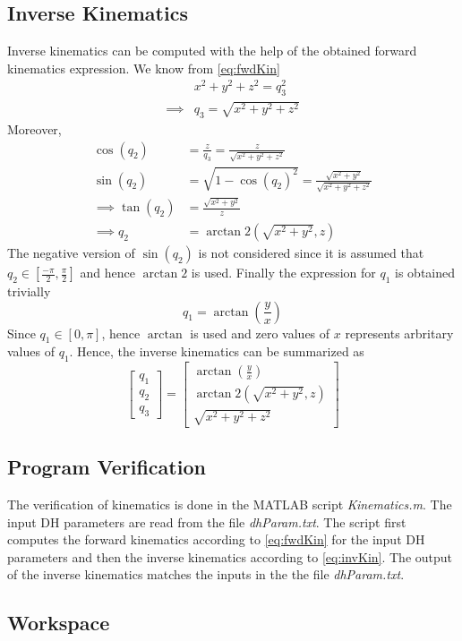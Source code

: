 \subsection{Inverse Kinematics}
Inverse kinematics can be computed with the help of the obtained forward kinematics expression. We know from \eqref{eq:fwdKin}
\begin{align*}
	&x^2 + y^2 + z^2 = q_3^2 \\
	\implies&q_3 = \sqrt{x^2 + y^2 + z^2}
\end{align*}
Moreover,
\begin{align*}
	\cos\left(q_2\right) &= \frac{z}{q_3} = \frac{z}{\sqrt{x^2 + y^2 + z^2}}\\
	\sin\left(q_2\right) &= \sqrt{1 - \cos\left(q_2\right)^2} = \frac{\sqrt{x^2 + y^2}}{\sqrt{x^2 + y^2 + z^2}} \\
	\implies \tan\left(q_2\right) &= \frac{\sqrt{x^2 + y^2}}{z} \\
	\implies q_2 &= \arctan2\left(\sqrt{x^2 + y^2},z\right)
\end{align*}
The negative version of $\sin\left(q_2\right)$ is not considered since it is assumed that $q_2 \in \left[\frac{-\pi}{2},\frac{\pi}{2}\right]$ and hence $\arctan2$ is used. Finally the expression for $q_1$ is obtained trivially
\begin{equation*}
	q_1 = \arctan\left(\frac{y}{x}\right)
\end{equation*}
Since $q_1 \in \left[0,\pi\right]$, hence $\arctan$ is used and zero values of $x$ represents arbritary values of $q_1$.
Hence, the inverse kinematics can be summarized as 
\begin{equation}
	\begin{bmatrix}
		q_1\\
		q_2\\
		q_3
	\end{bmatrix} = \begin{bmatrix}
	\arctan\left(\frac{y}{x}\right)\\
	\arctan2\left(\sqrt{x^2 + y^2},z\right)\\
	\sqrt{x^2 + y^2 + z^2}
\end{bmatrix}
\label{eq:invKin}
\end{equation}
\subsection{Program Verification}
The verification of kinematics is done in the MATLAB\textsuperscript{\textregistered} script \emph{Kinematics.m}. The input DH parameters are read from the file \emph{dhParam.txt}. The script first computes the forward kinematics according to \eqref{eq:fwdKin} for the input DH parameters and then the inverse kinematics according to \eqref{eq:invKin}. The output of the inverse kinematics matches the inputs in the the file \emph{dhParam.txt}.

\subsection{Workspace}
